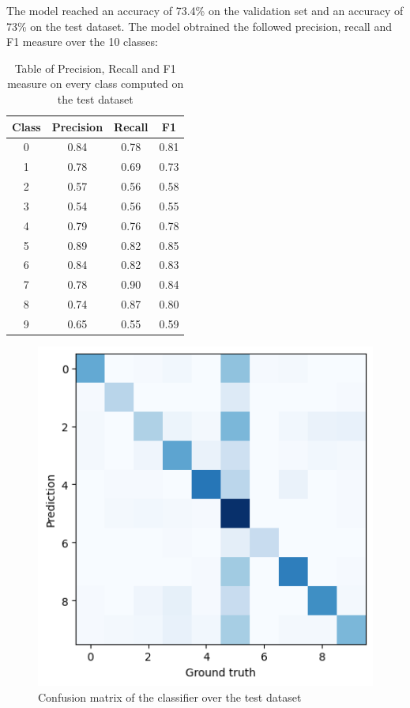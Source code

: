 \documentclass[12pt,journal,compsoc]{IEEEtran}
\begin{document}
The model reached an accuracy of 73.4\% on the validation set and an accuracy of 73\% on the test dataset. The model obtrained the followed precision, recall and F1 measure over the 10 classes: 
\begin{table}[ht]
	\centering
	\begin{tabular}{c c c c }
		Class & Precision & Recall & F1  \\
		\hline
		0 & 0.84 &0.78  &0.81     \\
		1 & 0.78 &0.69  &0.73      \\
		2 & 0.57 &0.56  &0.58       \\
		3 & 0.54 &0.56  &0.55        \\ 
		4 & 0.79 &0.76  &0.78        \\
		5 & 0.89 &0.82  &0.85        \\
		6 & 0.84 &0.82  &0.83       \\
		7 & 0.78 &0.90  &0.84        \\
		8 & 0.74 &0.87  &0.80        \\
		9 & 0.65 &0.55  &0.59        \\
	\end{tabular}
	\caption{Table of Precision, Recall and F1 measure on every class computed on the test dataset}
	\end{table}
	\begin{figure}[H]
		\begin{center}
		\includegraphics[scale=.75]{./images/confmat_sound_mlp.png}
		\end{center}
		\caption{Confusion matrix of the classifier over the test dataset}
	\end{figure}
\end{document}
